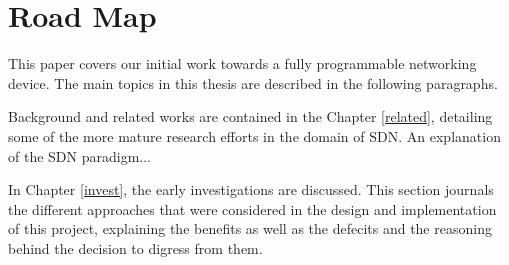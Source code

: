 %
%

\section{Road Map}
\label{intro:map}
This paper covers our initial work towards a fully programmable networking
device. The main topics in this thesis are described in the following paragraphs.

Background and related works are contained in the Chapter \ref{related},
detailing some of the more mature research efforts in the domain of SDN. An
explanation of the SDN paradigm...

In Chapter \ref{invest}, the early investigations are discussed. This section
journals the different approaches that were considered in the design and
implementation of this project, explaining the benefits as well as the defecits
and the reasoning behind the decision to digress from them.

